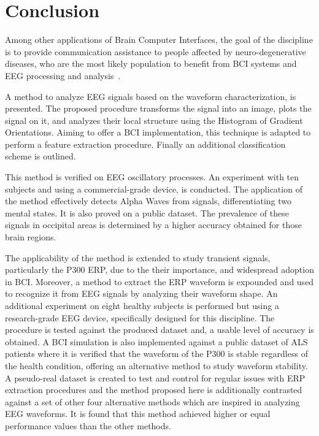 \section{Conclusion}
Among other applications of Brain Computer Interfaces, the goal of the discipline is to provide communication assistance to people affected by neuro-degenerative diseases, who are the most likely population to benefit from BCI systems and EEG processing and analysis~\cite{WolpawJonathanR2012}.

A method to analyze EEG signals based on the waveform characterization, is presented. The proposed procedure transforms the signal into an image, plots the signal on it, and analyzes their local structure using the Histogram of Gradient Orientations.   Aiming to offer a BCI implementation, this technique is adapted to perform a feature extraction procedure.  Finally an additional classification scheme is outlined.

This method is verified on EEG oscillatory processes.  An experiment with ten subjects and using a commercial-grade device, is conducted.  The application of the method effectively detects Alpha Waves from signals, differentiating two mental states.  It is also proved on a public dataset.  The prevalence of these signals in occipital areas is determined by a higher accuracy obtained for those brain regions.

The applicability of the method is extended to study transient signals, particularly the P300 ERP,  due to the their importance, and widespread adoption in BCI.  Moreover, a method to  extract the ERP waveform is expounded and used to recognize it from EEG signals by analyzing their waveform shape.  An additional experiment on eight healthy subjects is performed but using a research-grade EEG device, specifically designed for this discipline.  The procedure is tested against the produced dataset and, a usable level of accuracy is obtained.  A BCI simulation is also implemented against a public dataset of ALS patients where it is verified that the waveform of the P300 is stable regardless of the health condition, offering an alternative method to study waveform stability.  A pseudo-real dataset is created to test and control for regular issues with ERP extraction procedures and the method proposed here is additionally contrasted against a set of other four alternative methods which are inspired in analyzing EEG waveforms.  It is found that this method achieved higher or equal performance values than the other methods.

